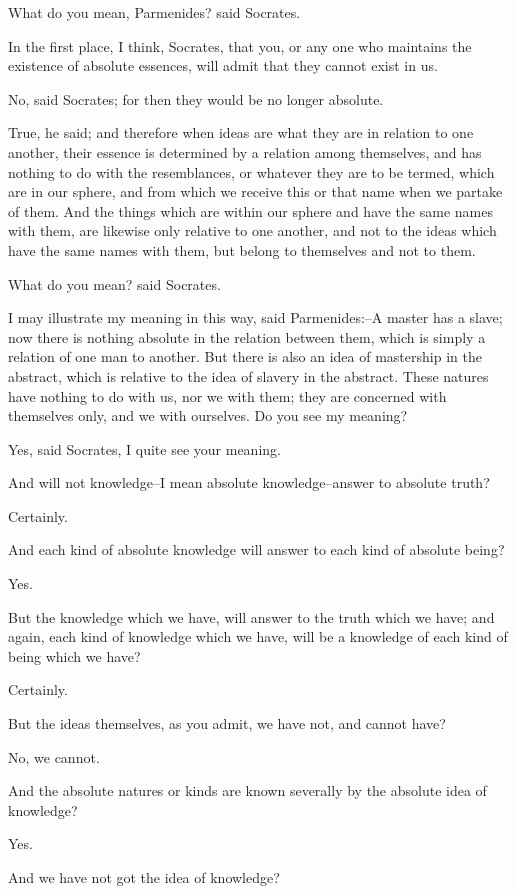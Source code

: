 What do you mean, Parmenides? said Socrates.

In the first place, I think, Socrates, that you, or any one who
maintains the existence of absolute essences, will admit that they
cannot exist in us.

No, said Socrates; for then they would be no longer absolute.

True, he said; and therefore when ideas are what they are in relation to
one another, their essence is determined by a relation among themselves,
and has nothing to do with the resemblances, or whatever they are to be
termed, which are in our sphere, and from which we receive this or that
name when we partake of them. And the things which are within our sphere
and have the same names with them, are likewise only relative to one
another, and not to the ideas which have the same names with them, but
belong to themselves and not to them.

What do you mean? said Socrates.

I may illustrate my meaning in this way, said Parmenides:--A master has
a slave; now there is nothing absolute in the relation between them,
which is simply a relation of one man to another. But there is also an
idea of mastership in the abstract, which is relative to the idea of
slavery in the abstract. These natures have nothing to do with us,
nor we with them; they are concerned with themselves only, and we with
ourselves. Do you see my meaning?

Yes, said Socrates, I quite see your meaning.

And will not knowledge--I mean absolute knowledge--answer to absolute
truth?

Certainly.

And each kind of absolute knowledge will answer to each kind of absolute
being?

Yes.

But the knowledge which we have, will answer to the truth which we have;
and again, each kind of knowledge which we have, will be a knowledge of
each kind of being which we have?

Certainly.

But the ideas themselves, as you admit, we have not, and cannot have?

No, we cannot.

And the absolute natures or kinds are known severally by the absolute
idea of knowledge?

Yes.

And we have not got the idea of knowledge?

